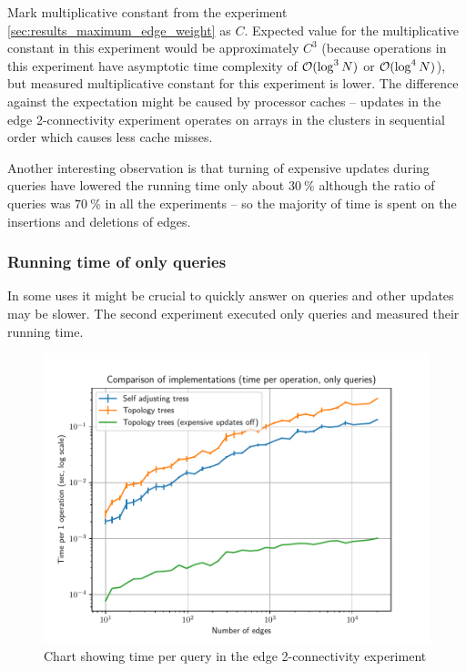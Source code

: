 Mark multiplicative constant from the experiment
\ref{sec:results_maximum_edge_weight} as $C$. Expected value for the
multiplicative constant in this experiment would be approximately $C^3$ (because
operations in this experiment have asymptotic time complexity of ${\cal O}(\log^3 N)$
or ${\cal O}(\log^4 N)$), but measured multiplicative constant for this experiment is
lower. The difference against the expectation might be caused by processor
caches -- updates in the edge 2-connectivity experiment operates on arrays in
the clusters in sequential order which causes less cache misses.

Another interesting observation is that turning of expensive updates during
queries have lowered the running time only about $30\ \%$ although the ratio of
queries was $70\ \%$ in all the experiments -- so the majority of time is spent
on the insertions and deletions of edges.

\subsubsection{Running time of only queries}

In some uses it might be crucial to quickly answer on queries and other
updates may be slower. The second experiment executed only queries and measured
their running time.

\begin{figure}[H]
\centering
{}\hsize
\includegraphics[width=\hsize]{charts/double_edge_connectivity_op_queries.pdf}
\caption{Chart showing time per query in the edge 2-connectivity experiment}
\end{figure}

